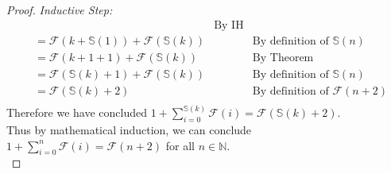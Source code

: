 \documentclass{article}
\newcommand{\naturals}{\mathbb{N}}
\newcommand{\s}{\mathbb{S}}
\newcommand{\fibonacci}{\mathcal{F}}
\newenvironment{case}[1][Case]
    {\par\textit{#1:}\hfill\break}
    {}
\begin{document}
\begin{enumerate}
\begin{proof}
\begin{case}[Inductive Step]
\begin{align*}
            &\quad
            &\text{By IH}
              \\
            &=\fibonacci(k + \s(1))+\fibonacci(\s(k))
            &\quad
            &\text{By definition of }\s(n)
              \\
            &=\fibonacci(k + 1+1)+\fibonacci(\s(k))
            &\quad
            &\text{By Theorem}
              \\
            &=\fibonacci(\s(k) + 1)+\fibonacci(\s(k))
            &\quad
            &\text{By definition of }\s(n)
              \\
            &=\fibonacci(\s(k) + 2)
            &\quad
            &\text{By definition of } \fibonacci(n+2)
              \\
        \end{align*}
        Therefore we have concluded $1 + \displaystyle\sum_{i = 0}^{\s(k)}\fibonacci(i) = \fibonacci(\s(k) + 2)$.\\
        \end{case}
        Thus by mathematical induction, we can conclude $1 + \displaystyle\sum_{i = 0}^{n}\fibonacci(i) = \fibonacci(n + 2)$ for all $n \in \naturals$.\\  
        \end{proof}
\end{enumerate}
\end{document}
